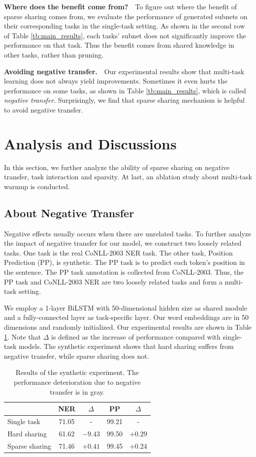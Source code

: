 \documentclass[letterpaper]{article} %
\begin{document}
\textbf{Where does the benefit come from?}\ \ To figure out where the benefit of sparse sharing comes from, we evaluate the performance of generated subnets on their corresponding tasks in the single-task setting. As shown in the second row of Table \ref{tb:main_results}, each tasks' subnet does not significantly improve the performance on that task. Thus the benefit comes from shared knowledge in other tasks, rather than pruning.

\textbf{Avoiding negative transfer.}\ \ Our experimental results show that multi-task learning does not always yield improvements. Sometimes it even hurts the performance on some tasks, as shown in Table \ref{tb:main_results}, which is called \textit{negative transfer}. Surprisingly, we find that sparse sharing mechanism is helpful to avoid negative transfer.

\section{Analysis and Discussions}
In this section, we further analyze the ability of sparse sharing on negative transfer, task interaction and sparsity. At last, an ablation study about multi-task warmup is conducted.

\subsection{About Negative Transfer}
Negative effects usually occurs when there are unrelated tasks. To further analyze the impact of negative transfer for our model, we construct two loosely related tasks. One task is the real CoNLL-2003 NER task. The other task, Position Prediction (PP), is synthetic. The PP task is to predict each token's position in the sentence. The PP task annotation is collected from CoNLL-2003. Thus, the PP task and CoNLL-2003 NER are two loosely related tasks and form a multi-task setting.

We employ a 1-layer BiLSTM with 50-dimensional hidden size as shared module and a fully-connected layer as task-specific layer. Our word embeddings are in 50 dimensions and randomly initialized. Our experimental results are shown in Table \ref{tb:task_rel}. Note that $\Delta$ is defined as the increase of performance compared with single-task models. The synthetic experiment shows that hard sharing suffers from negative transfer, while sparse sharing does not.

\begin{table}[htbp]
\centering
\begin{tabular}{l|cc|cc}
\toprule
& NER & $\Delta$ & PP & $\Delta$ \\ \midrule
Single task & 71.05 & - & 99.21 & - \\
Hard sharing & {\cellcolor[HTML]{D6D6D6}61.62} & {\cellcolor[HTML]{D6D6D6} $-9.43$} & 99.50 & $+0.29$ \\
Sparse sharing & 71.46 & $+0.41$ & 99.45 & $+0.24$ \\ \bottomrule
\end{tabular}
\caption{Results of the synthetic experiment. The performance deterioration due to negative transfer is in gray.}
\label{tb:task_rel}
\end{table}
\end{document}
